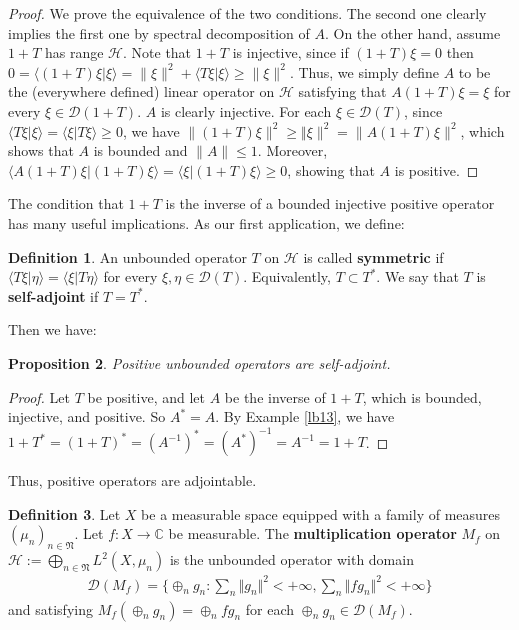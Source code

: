 \documentclass[12pt,b5paper,notitlepage]{article}
\theoremstyle{definition}
\newtheorem{df}{Definition}[section]
\theoremstyle{plain}
\newtheorem{pp}[df]{Proposition}
\newcommand{\fk}{\mathfrak}
\newcommand{\mc}{\mathcal}
\newcommand{\Dom}{\scr D}
\newcommand{\bk}[1]{\langle {#1}\rangle}
\newcommand{\scr}{\mathscr}
\newcommand{\Cbb}{\mathbb C}
\numberwithin{equation}{section}
\begin{document}
\begin{proof}
We prove the equivalence of the two conditions. The second one clearly implies the first one by spectral decomposition of $A$. On the other hand, assume $1+T$ has range $\mc H$. Note that $1+T$ is injective, since if $(1+T)\xi=0$ then $0=\bk{(1+T)\xi|\xi}=\lVert\xi\lVert^2+\bk{T\xi|\xi}\geq \lVert\xi\lVert^2$. Thus, we simply define $A$ to be the (everywhere defined) linear operator on $\mc H$ satisfying that $A(1+T)\xi=\xi$ for every $\xi\in\Dom(1+T)$. $A$ is clearly injective. For each $\xi\in\Dom(T)$, since $\bk{T\xi|\xi}=\bk{\xi|T\xi}\geq 0$, we have $\lVert (1+T)\xi\lVert^2\geq \Vert\xi\lVert^2=\lVert A(1+T)\xi\lVert^2$, which shows that $A$ is bounded and $\lVert A\lVert\leq 1$. Moreover, $\bk{A(1+T)\xi|(1+T)\xi}=\bk{\xi|(1+T)\xi}\geq 0$, showing that $A$ is positive.
\end{proof}



The condition that $1+T$ is the inverse of a bounded injective positive operator has many useful implications. As our first application, we define: 


\begin{df}
An  unbounded operator $T$ on $\mc H$ is called \textbf{symmetric} if $\bk{T\xi|\eta}=\bk{\xi|T\eta}$ for every $\xi,\eta\in\Dom(T)$. Equivalently, $T\subset T^*$. We say that $T$ is \textbf{self-adjoint} if $T=T^*$.
\end{df}

Then we have:
\begin{pp}\label{lb20}
Positive unbounded operators are self-adjoint.
\end{pp}

\begin{proof}
Let $T$ be positive, and let $A$ be the inverse of $1+T$, which is bounded, injective, and positive. So $A^*=A$. By Example \ref{lb13}, we have $1+T^*=(1+T)^*=(A^{-1})^*=(A^*)^{-1}=A^{-1}=1+T$.
\end{proof}



Thus, positive operators are adjointable.




\begin{df}\label{lb104}
Let $X$ be a measurable space equipped with a family of measures $(\mu_n)_{n\in\fk N}$. Let $f:X\rightarrow\Cbb$ be measurable. The \textbf{multiplication operator}  $M_f$ on $\mc H:=\bigoplus_{n\in\fk N}L^2(X,\mu_n)$ is the unbounded operator with domain
\begin{align*}
\Dom(M_f)=\Big\{\oplus_n g_n:\sum_n\Vert g_n\Vert^2<+\infty,\sum_n\Vert fg_n\Vert^2<+\infty\Big\}
\end{align*}
and satisfying $M_f(\oplus_n g_n)=\oplus_n fg_n$ for each $\oplus_n g_n\in\Dom(M_f)$. 
\end{df}
\end{document}
